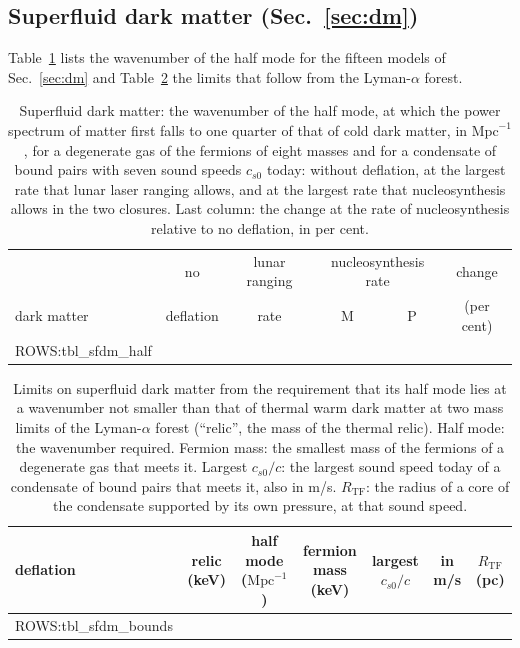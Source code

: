 \subsection{Superfluid dark matter (Sec.~\ref{sec:dm})}

Table~\ref{tab:xsfdmhalf} lists the wavenumber of the half mode for the fifteen models of
Sec.~\ref{sec:dm} and Table~\ref{tab:xsfdmbounds} the limits that follow from the Lyman-$\alpha$
forest.

\begin{table}
\caption{\label{tab:xsfdmhalf}Superfluid dark matter: the wavenumber of the half mode, at which the
power spectrum of matter first falls to one quarter of that of cold dark matter, in
$\mathrm{Mpc}^{-1}$, for a degenerate gas of the fermions of eight masses and for a condensate of
bound pairs with seven sound speeds $c_{s0}$ today: without deflation, at the largest rate that lunar
laser ranging allows, and at the largest rate that nucleosynthesis allows in the two closures. Last
column: the change at the rate of nucleosynthesis relative to no deflation, in per cent.}
\begin{ruledtabular}
\begin{tabular}{lccccc}
 & no & lunar ranging & \multicolumn{2}{c}{nucleosynthesis rate} & change \\
dark matter & deflation & rate & M & P & (per cent) \\
\hline
{{ROWS:tbl_sfdm_half}}
\end{tabular}
\end{ruledtabular}
\end{table}

\begin{table}
\caption{\label{tab:xsfdmbounds}Limits on superfluid dark matter from the requirement that its half
mode lies at a wavenumber not smaller than that of thermal warm dark matter at two mass limits of the
Lyman-$\alpha$ forest (``relic'', the mass of the thermal relic). Half mode: the wavenumber required.
Fermion mass: the smallest mass of the fermions of a degenerate gas that meets it. Largest $c_{s0}/c$:
the largest sound speed today of a condensate of bound pairs that meets it, also in m/s.
$R_{\mathrm{TF}}$: the radius of a core of the condensate supported by its own pressure, at that
sound speed.}
\begin{ruledtabular}
\begin{tabular}{lcccccc}
deflation & relic (keV) & half mode ($\mathrm{Mpc}^{-1}$) & fermion mass (keV) & largest $c_{s0}/c$ & in m/s & $R_{\mathrm{TF}}$ (pc) \\
\hline
{{ROWS:tbl_sfdm_bounds}}
\end{tabular}
\end{ruledtabular}
\end{table}

